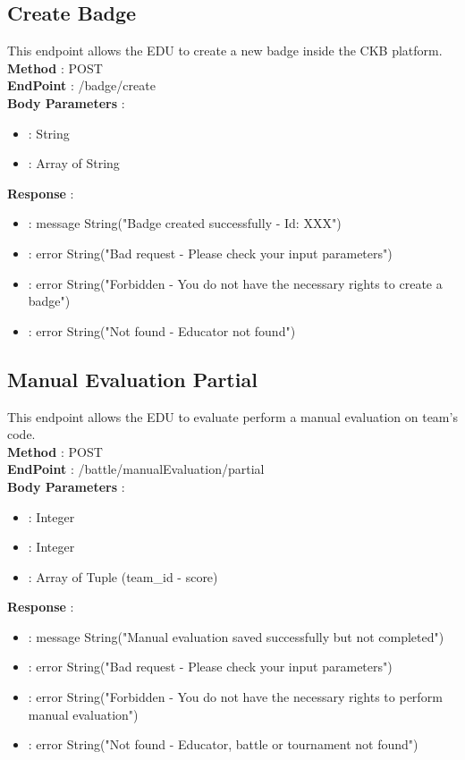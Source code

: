 \subsection*{Create Badge}
This endpoint allows the EDU to create a new badge inside the CKB platform.\\
\textbf{Method} : POST \\
\textbf{EndPoint} : /badge/create \\
\textbf{Body Parameters} :
\begin{itemize}
    \item {} : String
    \item {} : Array of String    
\end{itemize}
\textbf{Response} :
\begin{itemize}
    \item {} : message String("Badge created successfully - Id: XXX")
    \item {} : error String("Bad request - Please check your input parameters")
    \item {} : error String("Forbidden - You do not have the necessary rights to create a badge")
    \item {} : error String("Not found - Educator not found")
\end{itemize}

\subsection*{Manual Evaluation Partial}
This endpoint allows the EDU to evaluate perform a manual evaluation on team's code.\\
\textbf{Method} : POST \\
\textbf{EndPoint} : /battle/manualEvaluation/partial \\
\textbf{Body Parameters} :
\begin{itemize}
    \item {} : Integer
    \item {} : Integer
    \item {} : Array of Tuple (team\_id - score)   
\end{itemize}
\textbf{Response} :
\begin{itemize}
    \item {} : message String("Manual evaluation saved successfully but not completed")
    \item {} : error String("Bad request - Please check your input parameters")
    \item {} : error String("Forbidden - You do not have the necessary rights to perform manual evaluation")
    \item {} : error String("Not found - Educator, battle or tournament not found")
\end{itemize}


